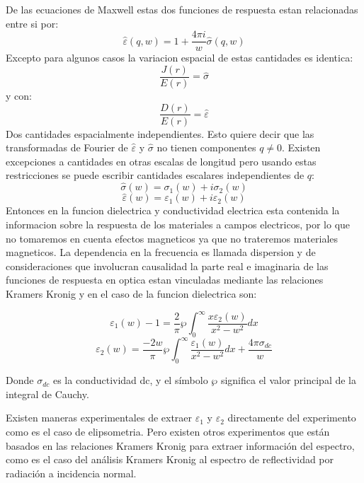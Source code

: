 \documentclass[a4paper,openright,12pt]{book}
\begin{document}
De las ecuaciones de Maxwell estas dos funciones de respuesta estan relacionadas entre si por:
\begin{equation}
\hat{\varepsilon}(q,w)=1+\dfrac{4\pi i}{w}\hat{\sigma }(q,w)
\end{equation}
Excepto para algunos casos la variacion espacial de estas cantidades es identica:
\begin{equation}
\dfrac{J(r)}{E(r)}=\hat{\sigma }
\end{equation}
y con:
\begin{equation}
\dfrac{D(r)}{E(r)}=\hat{\varepsilon}
\end{equation}
Dos cantidades espacialmente independientes. Esto quiere decir que las transformadas de Fourier de $\hat{\varepsilon}$ y $\hat{\sigma}$ no tienen componentes $q\neq 0$. Existen  excepciones a cantidades en otras escalas de longitud pero usando estas restricciones se puede escribir cantidades escalares independientes de $q$:
\begin{equation}\label{varepsi}
\hat{\sigma}(w)=\sigma_{1}(w)+i\sigma_{2}(w)
\end{equation}
\begin{equation}
\hat{\varepsilon}(w)=\varepsilon_{1}(w)+i\varepsilon_{2}(w)
\end{equation}
Entonces en la funcion dielectrica y conductividad electrica esta contenida la informacion sobre la respuesta de los materiales a campos electricos, por lo que no tomaremos en cuenta efectos magneticos ya que no trateremos materiales magneticos. La dependencia en la frecuencia es llamada dispersion y de consideraciones que involucran causalidad la parte real e imaginaria de las funciones de respuesta en optica estan vinculadas mediante las relaciones Kramers Kronig y en el caso de la funcion dielectrica son:

\begin{equation}\label{varepsi1}
\varepsilon_{1}(w)-1=\frac{2}{\pi}\wp \int_{0}^{\infty}\frac{x\varepsilon_{2}(w)}{x^{2}-w^{2}}dx
\end{equation}
\begin{equation}\label{varepsi2}
\varepsilon_{2}(w)=\frac{-2w}{\pi}\wp\int_{0}^{\infty}\frac{\varepsilon_{1}(w)}{x^{2}-w^{2}}dx+\frac{4\pi\sigma_{dc}}{w}
\end{equation}

Donde $\sigma_{dc}$ es la conductividad dc, y el símbolo $\wp$ significa el valor principal de la integral de Cauchy. 

Existen maneras experimentales de extraer $\varepsilon_{1}$  y $\varepsilon_{2}$ directamente del experimento como es el caso de elipsometria. Pero existen otros experimentos que están basados en las relaciones Kramers Kronig para extraer información del espectro, como es el caso del análisis Kramers Kronig al espectro de reflectividad por radiación a incidencia normal. 
\end{document}
